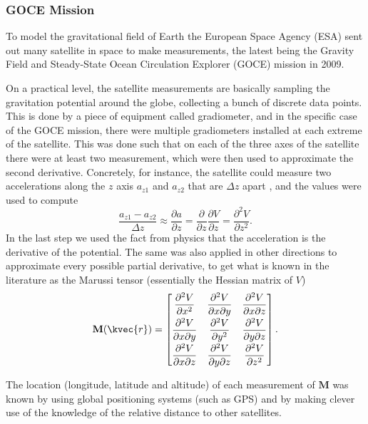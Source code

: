 \subsubsection{GOCE Mission}

To model the gravitational field of Earth the European Space Agency (ESA) sent
out many satellite in space to make measurements, the latest being the Gravity
Field and Steady-State Ocean Circulation Explorer (GOCE) mission in 2009.

On a practical level, the satellite measurements are basically sampling the
gravitation potential around the globe, collecting a bunch of discrete data
points. This is done by a piece of equipment called gradiometer, and in the
specific case of the GOCE mission, there were multiple gradiometers installed at
each extreme of the satellite. This was done such that on each of the three axes
of the satellite there were at least two measurement, which were then used to
approximate the second derivative. Concretely, for instance, the satellite could
measure two accelerations along the $z$ axis $a_{z1}$ and $a_{z2}$ that are
$\Delta z$ apart , and the values were used to compute
\begin{equation*}
  \frac{a_{z1} - a_{z2}}{\Delta z}
  \approx \frac{\partial a}{\partial z}
  = \frac{\partial}{\partial z} \frac{\partial V}{\partial z}
  = \frac{\partial^2 V}{\partial z^2}.
\end{equation*}
In the last step we used the fact from physics that the acceleration is the
derivative of the potential.  The same was also applied in other directions to
approximate every possible partial derivative, to get what is known in the
literature as the Marussi tensor (essentially the Hessian matrix of $V$)
\begin{equation*}
  \mathbf{M}(\kvec{r}) = \begin{bmatrix}
    \dfrac{\partial^2 V}{\partial x^2} &
    \dfrac{\partial^2 V}{\partial x \partial y} &
    \dfrac{\partial^2 V}{\partial x \partial z} \\[0.7em]
    \dfrac{\partial^2 V}{\partial x \partial y} &
    \dfrac{\partial^2 V}{\partial y^2} &
    \dfrac{\partial^2 V}{\partial y \partial z} \\[0.7em]
    \dfrac{\partial^2 V}{\partial x \partial z} &
    \dfrac{\partial^2 V}{\partial y \partial z} &
    \dfrac{\partial^2 V}{\partial z^2}
  \end{bmatrix}.
\end{equation*}

The location (longitude, latitude and altitude) of each measurement of
$\mathbf{M}$ was known by using global positioning systems (such as GPS) and by
making clever use of the knowledge of the relative distance to other satellites.

